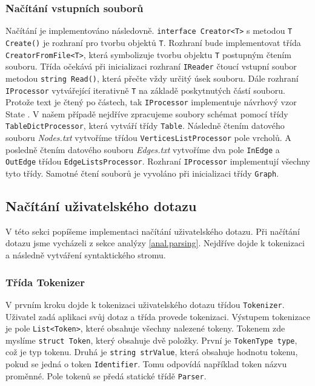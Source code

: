 \subsubsection{Načítání vstupních souborů}

Načítání je implementováno následovně.
\texttt{interface Creator<T>} s metodou \texttt{T Create()} je rozhraní pro tvorbu objektů \texttt{T}.
Rozhraní bude implementovat třída \texttt{CreatorFromFile<T>}, která symbolizuje tvorbu objektu \texttt{T} postupným čtením souboru.
Třída očekává při inicializaci rozhraní \texttt{IReader} čtoucí vstupní soubor metodou \texttt{string Read()}, která přečte vždy určitý úsek souboru.
Dále rozhraní \texttt{IProcessor} vytvářející iterativně \texttt{T} na základě poskytnutých částí souboru.
Protože text je čtený po částech, tak \texttt{IProcessor} implementuje návrhový vzor State \citep[str. 305]{patterns}.
V našem případě nejdříve zpracujeme soubory schémat pomocí třídy \texttt{TableDictProcessor}, která vytváří třídy \texttt{Table}.
Následně čtením datového souboru \textit{Nodes.txt} vytvoříme třídou \texttt{VerticesListProcessor} pole vrcholů.
A posledně čtením datového souboru \textit{Edges.txt} vytvoříme dva pole \texttt{InEdge} a \texttt{OutEdge} třídou \texttt{EdgeListsProcessor}. 
Rozhraní \texttt{IProcessor} implementují všechny tyto třídy.
Samotné čtení souborů je vyvoláno při inicializaci třídy \texttt{Graph}.

\subsection{Načítání uživatelského dotazu} \label{impl.parsing}

V této sekci popíšeme implementaci načítání uživatelského dotazu.
Při načítání dotazu jsme vycházeli z sekce analýzy \ref{anal.parsing}.
Nejdříve dojde k tokenizaci a následně vytváření syntaktického stromu.

\subsubsection{Třída Tokenizer}

V prvním kroku dojde k tokenizaci uživatelského dotazu třídou \texttt{Tokenizer}.
Uživatel zadá aplikaci svůj dotaz a třída provede tokenizaci.
Výstupem tokenizace je pole \texttt{List<Token>}, které obsahuje všechny nalezené tokeny.
Tokenem zde myslíme \texttt{struct Token}, který obsahuje dvě položky.
První je \texttt{TokenType type}, což je typ tokenu.
Druhá je \texttt{string strValue}, která obsahuje hodnotu tokenu, pokud se jedná o token \texttt{Identifier}.
Tomu odpovídá například token názvu proměnné.
Pole tokenů se předá statické třídě \texttt{Parser}.

